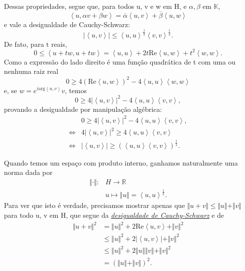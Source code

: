 \documentclass[../functional_analysis.tex]{subfiles}
\begin{document}
Dessas propriedades, segue que, para todos u, v e w em H, e \(\alpha , \beta \) em \(\mathbb{K}\),
\[
	\left< u, \alpha v + \beta w \right> = \overline{\alpha }\left< u, v \right> + \overline{\beta }\left< u, w \right>
\]
e vale a \hypertarget{cauchy_schwarz}{desigualdade de Cauchy-Schwarz}:
\[
	| \left< u, v \right> | \leq \left< u, u \right>^{\frac{1}{2}}\left< v, v \right>^{\frac{1}{2}}.
\]
De fato, para t reais,
\[
	0\leq \left< u+tw, u+tw \right> = \left< u, u \right> + 2t \mathrm{Re}\left< u, w \right> + t^{2}\left< w, w \right>.
\]
Como a expressão do lado direito é uma função quadrática de t com uma ou nenhuma raiz real
\[
	0\geq 4(\mathrm{Re}\left< u, w \right>)^{2} - 4 \left< u, u \right>\left< w, w \right>
\]
e, se \(w = e^{i \mathrm{arg}\left< u, v \right>}v\), temos
\[
	0\geq 4 | \left< u, v \right> |^{2} - 4 \left< u, u \right>\left< v, v \right>,
\]
provando a desigualdade por manipulação algébrica:
\begin{align*}
	                    & 0\geq 4 | \left< u, v \right> |^{2} - 4 \left< u, u \right>\left< v, v \right>,      \\
	\Longleftrightarrow & 4 | \left< u, v \right> |^{2} \geq 4 \left< u, u \right>\left< v, v \right>          \\
	\Longleftrightarrow & | \left< u, v \right> | \geq (\left< u, u \right>\left< v, v \right>)^{\frac{1}{2}}.
\end{align*}

Quando temos um espaço com produto interno, ganhamos naturalmente uma norma dada por
\begin{align*}
	\Vert \cdot  \Vert: & H\rightarrow \mathbb{R}                                         \\
	                    & u\longmapsto \Vert u \Vert = \left< u, u \right>^{\frac{1}{2}}.
\end{align*}
Para ver que isto é verdade, precisamos mostrar apenas que \(\Vert u + v \Vert\leq \Vert u \Vert + \Vert v \Vert\) para todo u, v em H, que segue da \hyperlink{cauchy_schwarz}{\textit{desigualdade de Cauchy-Schwarz}} e de
\begin{align*}
	\Vert u+v \Vert^{2} & = \Vert u \Vert^{2} + 2 \mathrm{Re}\left< u, v \right> + \Vert v \Vert^{2} \\
	                    & \leq \Vert u \Vert^{2} + 2 | \left< u, v \right> | + \Vert v \Vert^{2}     \\
	                    & \leq \Vert u \Vert^{2} + 2 \Vert u \Vert\Vert v \Vert + \Vert v \Vert^{2}  \\
	                    & = (\Vert u \Vert + \Vert v \Vert)^{2}.
\end{align*}
\end{document}
